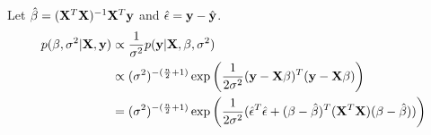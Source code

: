 \documentclass{article}
\begin{document}
	\subsection{}
	Let $\hat{\beta} = ({\bf X}^T{\bf X})^{-1}{\bf X}^T{\bf y}$ and $\hat{\epsilon} = {\bf y}-\hat{{\bf y}}$.
		\begin{align*}
		p(\beta, \sigma^2 | {\bf X}, {\bf y}) &\propto \frac{1}{\sigma^2} p({\bf y} | {\bf X}, \beta, \sigma^2) \\
		&\propto (\sigma^2)^{-(\frac{n}{2} +1)} \exp\left( \frac{1}{2\sigma^2} ({\bf y} - {\bf X}\beta)^T ({\bf y} - {\bf X}\beta)\right)\\
		&= (\sigma^2)^{-(\frac{n}{2} +1)} \exp\left( \frac{1}{2\sigma^2} (\hat{\epsilon}^T\hat{\epsilon} + (\beta - \hat{\beta})^T ({\bf X}^T{\bf X})(\beta - \hat{\beta}) )\right)\\
		\end{align*}
\end{document}
